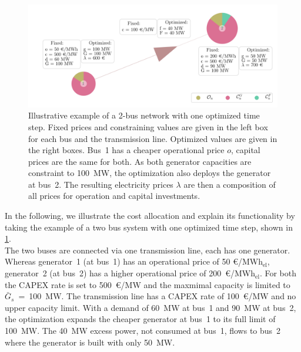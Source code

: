\documentclass[11pt,twocolumn]{article}
\newcommand{\capacitygenerationupper}{\bar{G}_{s}}
\newcommand{\megawatthour}{MWh$_\text{el}$}
\begin{document}
\begin{figure}[t]
    \centering
    \includegraphics[width=\linewidth]{example_network.png}
    \caption{Illustrative example of a 2-bus network with one optimized time step. Fixed prices and constraining values are given in the left box for each bus and the transmission line. Optimized values are given in the right boxes. Bus~1 has a cheaper operational price $o$, capital prices are the same for both. As both generator capacities are constraint to 100~MW, the optimization also deploys the generator at bus~2. The resulting electricity prices $\lambda$ are then a composition of all prices for operation and capital investments.}
    \label{fig:example_network}
    \end{figure}
In the following, we illustrate the cost allocation and explain its functionality by taking the example of a two bus system with one optimized time step, shown in \cref{fig:example_network}. \\
% 
% 
% 
% 
The two buses are connected via one transmission line, each has one generator. Whereas generator~1 (at bus~1) has an operational price of 50 \euro/\megawatthour, generator~2 (at bus~2) has a higher operational price of 200~\euro/\megawatthour. For both the CAPEX rate is set to 500~\euro/MW and the maxmimal capacity is limited to $\capacitygenerationupper$~=~100~MW. The transmission line has a CAPEX rate of 100~\euro/MW and no upper capacity limit. With a demand of 60~MW at bus~1 and 90~MW at bus~2, the optimization expands the cheaper generator at bus~1 to its full limit of 100~MW. The 40~MW excess power, not consumed at bus~1, flows to bus~2 where the generator is built with only 50~MW.  
% 
% 
\end{document}
